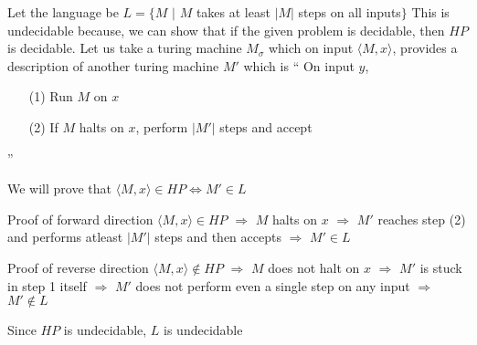 Let the language be $L = \{M$ $|$ $M$ takes at least $ |M| $ steps on all inputs$\} $
\newline
This is undecidable because, we can show that if the given problem is decidable, then $HP$ is decidable.
Let us take a turing machine $M_\sigma$ which on input $\langle M, x \rangle$, provides a description of another turing machine $M'$ which is 
\newline
``
    On input $y$, 
        \begin{enumerate}
            \item[(1)] Run $M$ on $x$
            \item[(2)] If $M$ halts on $x$, perform $|M'|$ steps and accept
        \end{enumerate}
''


We will prove that $\langle M, x \rangle \in HP \Leftrightarrow M' \in L$

Proof of forward direction
\newline
$\langle M, x \rangle \in HP$ 
\newline
$\Rightarrow$ 
$M$ halts on $x$
\newline
$\Rightarrow$
$M'$ reaches step (2) and performs atleast $|M'|$ steps and then accepts
\newline
$\Rightarrow$
$M' \in L$

Proof of reverse direction
\newline
$\langle M, x \rangle \notin HP$ 
\newline
$\Rightarrow$
$M$ does not halt on $x$
\newline
$\Rightarrow$
$M'$ is stuck in step 1 itself
\newline
$\Rightarrow$
$M'$ does not perform even a single step on any input
\newline
$\Rightarrow$
$M' \notin L$

Since $HP$ is undecidable, $L$ is undecidable













